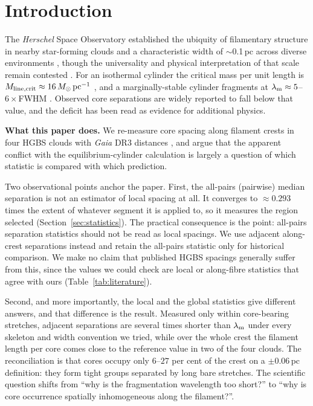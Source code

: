 \documentclass[usenatbib,twoside,twocolumn]{mnras}
\begin{document}
\section{Introduction}

The \textit{Herschel} Space Observatory established the ubiquity of filamentary structure in nearby star-forming clouds \citep{Andre2010} and a characteristic width of $\sim$0.1\,pc across diverse environments \citep{Arzoumanian2011}, though the universality and physical interpretation of that scale remain contested \citep{Panopoulou2017,Panopoulou2022}. For an isothermal cylinder the critical mass per unit length is $M_{\rm line,crit}\approx16\,M_\odot\,{\rm pc^{-1}}$ \citep{Ostriker1964}, and a marginally-stable cylinder fragments at $\lambda_{\rm m}\approx5$--$6\times$FWHM \citep{Inutsuka1992,Fischera2012}. Observed core separations are widely reported to fall below that value, and the deficit has been read as evidence for additional physics.

\smallskip\noindent\textbf{What this paper does.} We re-measure core spacing along filament crests in four HGBS clouds with \textit{Gaia} DR3 distances \citep{Zhang2023}, and argue that the apparent conflict with the equilibrium-cylinder calculation is largely a question of which statistic is compared with which prediction.

Two observational points anchor the paper. First, the all-pairs (pairwise) median separation is not an estimator of local spacing at all. It converges to $\approx0.293$ times the extent of whatever segment it is applied to, so it measures the region selected (Section~\ref{sec:statistics}). The practical consequence is the point: all-pairs separation statistics should not be read as local spacings. We use adjacent along-crest separations instead and retain the all-pairs statistic only for historical comparison. We make no claim that published HGBS spacings generally suffer from this, since the values we could check are local or along-fibre statistics that agree with ours (Table~\ref{tab:literature}).

Second, and more importantly, the local and the global statistics give different answers, and that difference is the result. Measured only within core-bearing stretches, adjacent separations are several times shorter than $\lambda_{\rm m}$ under every skeleton and width convention we tried, while over the whole crest the filament length per core comes close to the reference value in two of the four clouds. The reconciliation is that cores occupy only $6$--$27$ per cent of the crest on a $\pm0.06$\,pc definition: they form tight groups separated by long bare stretches. The scientific question shifts from ``why is the fragmentation wavelength too short?'' to ``why is core occurrence spatially inhomogeneous along the filament?''.
\end{document}
